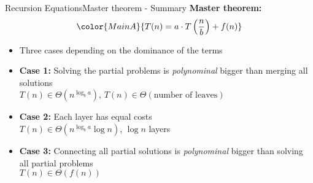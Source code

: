 \begin{frame}{Recursion Equations}{Master theorem - Summary}
  \textbf{Master theorem:}
  \begin{displaymath}
    \color{MainA}{
      T(n) = a \cdot T\left(\frac{n}{b}\right) + f(n)
    }
  \end{displaymath}
  \vspace{-1.0em}
  \begin{itemize}
    \item<3->
      Three cases depending on the dominance of the terms
    \item<4->
      \textbf{Case 1:}
      Solving the partial problems is \textit{polynominal} bigger than merging
      all solutions\\
      {\color{MainA}$T(n) \in \Theta(n^{\log_b a})$}, \hspace{3.5em}
      {\color{gray}$T(n) \in \Theta(\text{number of leaves})$}
      \vspace{0.5em}
   \item<5->
     \textbf{Case 2:}
     Each layer has equal costs\\
     {\color{MainA}$T(n) \in \Theta(n^{\log_b a} \log n)$}, \hspace{1.5em}
     {\color{gray}$\log n$ layers}
     \vspace{0.5em}
   \item<6->
     \textbf{Case 3:}
     Connecting all partial solutions is \textit{polynominal} bigger than
     solving all partial problems\\
     {\color{MainA}$T(n) \in \Theta(f(n))$}
  \end{itemize}
\end{frame}
